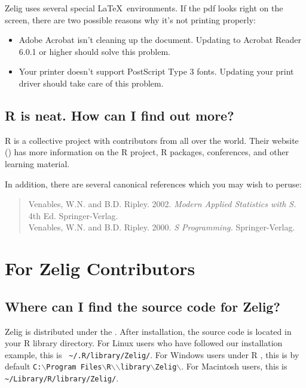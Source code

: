 Zelig uses several special \LaTeX\ environments.  If the pdf looks right
on the screen, there are two possible reasons why it's not printing
properly:  
\begin{itemize}
\item Adobe Acrobat isn't cleaning up the document.  Updating to
  Acrobat Reader 6.0.1 or higher should solve this problem.  
\item Your printer doesn't support PostScript Type 3 fonts.  Updating
  your print driver should take care of this problem.  
\end{itemize}

\subsection*{R is neat.  How can I find out more?}

R is a collective project with contributors from all over the world.
Their website
() has more
information on the R project, R packages, conferences, and other
learning material.

In addition, there are several canonical references which you may
wish to peruse:
\begin{verse}
Venables, W.N. and B.D. Ripley.  2002. \emph{Modern Applied Statistics with S.} 4th Ed.  Springer-Verlag.  \\
Venables, W.N. and B.D. Ripley.  2000. \emph{S Programming.} Springer-Verlag.  \\
\end{verse}

\section{For Zelig Contributors}

\subsection*{Where can I find the source code for Zelig?}

Zelig is distributed under the .  After installation,
the source code is located in your R library directory.  For Linux
users who have followed our installation example, this is {\tt
\~{}/.R/library/Zelig/}.  For Windows users under R \fullrvers, this is by
default {\tt C:$\backslash$Program Files$\backslash$R$\backslash$\rwvers$\backslash$library$\backslash$Zelig$\backslash$}.
For Macintosh users, this is {\tt \~{}/Library/R/library/Zelig/}.

